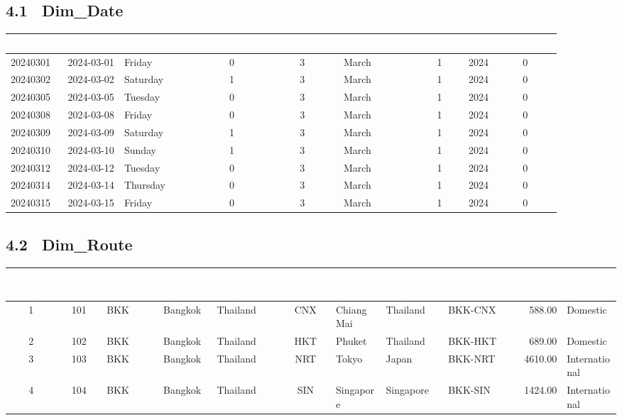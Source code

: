 \documentclass[11pt]{article}
\begin{document}
\subsection*{4.1 \ Dim_Date}
{\footnotesize
\begin{adjustbox}{max width=\linewidth}
\begin{tabular}{@{}l l l c c l c c c@{}}
\toprule
\rowcolor{tblHead}
\textcolor{white}{date_key} & \textcolor{white}{full_date} & \textcolor{white}{day_of_week} &
\textcolor{white}{is_weekend} & \textcolor{white}{month_num} & \textcolor{white}{month_name} &
\textcolor{white}{quarter} & \textcolor{white}{year} & \textcolor{white}{is_holiday}\\
\midrule
20240301 & 2024-03-01 & Friday   & 0 & 3 & March & 1 & 2024 & 0\\
20240302 & 2024-03-02 & Saturday & 1 & 3 & March & 1 & 2024 & 0\\
20240305 & 2024-03-05 & Tuesday  & 0 & 3 & March & 1 & 2024 & 0\\
20240308 & 2024-03-08 & Friday   & 0 & 3 & March & 1 & 2024 & 0\\
20240309 & 2024-03-09 & Saturday & 1 & 3 & March & 1 & 2024 & 0\\
20240310 & 2024-03-10 & Sunday   & 1 & 3 & March & 1 & 2024 & 0\\
20240312 & 2024-03-12 & Tuesday  & 0 & 3 & March & 1 & 2024 & 0\\
20240314 & 2024-03-14 & Thursday & 0 & 3 & March & 1 & 2024 & 0\\
20240315 & 2024-03-15 & Friday   & 0 & 3 & March & 1 & 2024 & 0\\
\bottomrule
\end{tabular}
\end{adjustbox}}

\subsection*{4.2 \ Dim_Route}
{\footnotesize
\begin{adjustbox}{max width=\linewidth}
\begin{tabular}{@{}c c l l l c l l l r l@{}}
\toprule
\rowcolor{tblHead}
\textcolor{white}{route_key} & \textcolor{white}{route_id} & \textcolor{white}{origin_code} &
\textcolor{white}{origin_city} & \textcolor{white}{origin_country} & \textcolor{white}{dest_code} &
\textcolor{white}{dest_city} & \textcolor{white}{dest_country} &
\textcolor{white}{route_name} & \textcolor{white}{distance_km} & \textcolor{white}{route_type}\\
\midrule
1 & 101 & BKK & Bangkok & Thailand & CNX & Chiang Mai & Thailand  & BKK-CNX & 588.00 & Domestic\\
2 & 102 & BKK & Bangkok & Thailand & HKT & Phuket     & Thailand  & BKK-HKT & 689.00 & Domestic\\
3 & 103 & BKK & Bangkok & Thailand & NRT & Tokyo      & Japan     & BKK-NRT & 4610.00 & International\\
4 & 104 & BKK & Bangkok & Thailand & SIN & Singapore  & Singapore & BKK-SIN & 1424.00 & International\\
\bottomrule
\end{tabular}
\end{adjustbox}}
\end{document}
